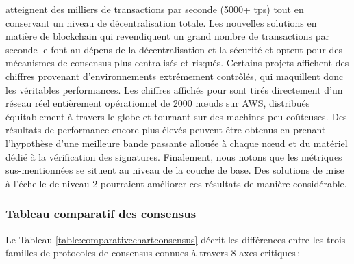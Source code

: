 \documentclass[runningheads,francais,a4paper]{llncs}
\begin{document}
\begin{itemize}
atteignent des milliers de transactions par seconde (5000+ tps) tout en conservant un niveau de décentralisation
totale. Les nouvelles solutions en matière de blockchain qui revendiquent un grand nombre de transactions par seconde
le font au dépens de la décentralisation et la sécurité et optent pour des mécanismes de consensus plus centralisés et
risqués. Certains projets affichent des chiffres provenant d'environnements extrêmement contrôlés, qui maquillent donc
les véritables performances. Les chiffres affichés pour \AVATokenName{} sont tirés directement d'un réseau
\AVAPlatformName{} réel entièrement opérationnel de 2000 nœuds sur AWS, distribués équitablement à travers le globe et
tournant sur des machines peu coûteuses. Des résultats de performance encore plus élevés peuvent être obtenus en prenant
l'hypothèse d'une meilleure bande passante allouée à chaque nœud et du matériel dédié à la vérification des signatures.
Finalement, nous notons que les métriques sus-mentionnées se situent au niveau de la couche de base. Des solutions de
mise à l'échelle de niveau 2 pourraient améliorer ces résultats de manière considérable.
\end{itemize}


\subsubsection{Tableau comparatif des consensus}
Le Tableau \ref{table:comparativechartconsensus} décrit les différences entre les trois familles de protocoles de
consensus connues à travers 8 axes critiques\,:
\end{document}
